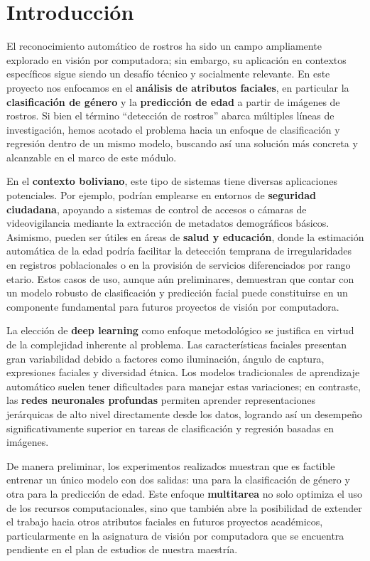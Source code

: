 \section{Introducción}

El reconocimiento automático de rostros ha sido un campo ampliamente explorado en visión por computadora; sin embargo,
su aplicación en contextos específicos sigue siendo un desafío técnico y socialmente relevante. En este proyecto nos
enfocamos en el \textbf{análisis de atributos faciales}, en particular la \textbf{clasificación de género} y
la \textbf{predicción de edad} a partir de imágenes de rostros. Si bien el término ``detección de rostros'' abarca
múltiples líneas de investigación, hemos acotado el problema hacia un enfoque de clasificación y regresión dentro
de un mismo modelo, buscando así una solución más concreta y alcanzable en el marco de este módulo.\newline

En el \textbf{contexto boliviano}, este tipo de sistemas tiene diversas aplicaciones potenciales.
Por ejemplo, podrían emplearse en entornos de \textbf{seguridad ciudadana}, apoyando a sistemas
de control de accesos o cámaras de videovigilancia mediante la extracción de metadatos demográficos
básicos. Asimismo, pueden ser útiles en áreas de \textbf{salud y educación}, donde la estimación
automática de la edad podría facilitar la detección temprana de irregularidades en registros
poblacionales o en la provisión de servicios diferenciados por rango etario. Estos casos de uso,
aunque aún preliminares, demuestran que contar con un modelo robusto de clasificación y predicción
facial puede constituirse en un componente fundamental para futuros proyectos de visión por computadora.\newline

La elección de \textbf{deep learning} como enfoque metodológico se justifica en virtud de la complejidad
inherente al problema. Las características faciales presentan gran variabilidad debido a factores como
iluminación, ángulo de captura, expresiones faciales y diversidad étnica. Los modelos tradicionales de
aprendizaje automático suelen tener dificultades para manejar estas variaciones; en contraste,
las \textbf{redes neuronales profundas} permiten aprender representaciones jerárquicas de alto nivel
directamente desde los datos, logrando así un desempeño significativamente superior en tareas de clasificación
y regresión basadas en imágenes.\newline

De manera preliminar, los experimentos realizados muestran que es factible entrenar un único modelo con
dos salidas: una para la clasificación de género y otra para la predicción de edad. Este
enfoque \textbf{multitarea} no solo optimiza el uso de los recursos computacionales, sino que también
abre la posibilidad de extender el trabajo hacia otros atributos faciales en futuros proyectos académicos,
particularmente en la asignatura de visión por computadora que se encuentra pendiente en el plan de estudios
de nuestra maestría.\newline
